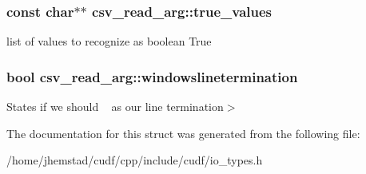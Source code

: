\subsubsection[{\texorpdfstring{true\+\_\+values}{true_values}}]{\setlength{\rightskip}{0pt plus 5cm}const char$\ast$$\ast$ csv\+\_\+read\+\_\+arg\+::true\+\_\+values}\hypertarget{structcsv__read__arg_adb8cdea9df6691421289515d6b7c58eb}{}\label{structcsv__read__arg_adb8cdea9df6691421289515d6b7c58eb}
list of values to recognize as boolean True 
\subsubsection[{\texorpdfstring{windowslinetermination}{windowslinetermination}}]{\setlength{\rightskip}{0pt plus 5cm}bool csv\+\_\+read\+\_\+arg\+::windowslinetermination}\hypertarget{structcsv__read__arg_af8f4c1bf9130fe4b6aaa021ef5371767}{}\label{structcsv__read__arg_af8f4c1bf9130fe4b6aaa021ef5371767}
States if we should ~\newline
 as our line termination$>$ 

The documentation for this struct was generated from the following file\+:\begin{DoxyCompactItemize}
\item 
/home/jhemstad/cudf/cpp/include/cudf/io\+\_\+types.\+h\end{DoxyCompactItemize}
